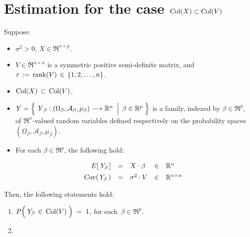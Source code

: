 

\section{Estimation for the case $\textnormal{Col}(X) \subset \textnormal{Col}(V)$}
\setcounter{theorem}{0}
\setcounter{equation}{0}

\renewcommand{\theenumi}{\roman{enumi}}
\renewcommand{\labelenumi}{\textnormal{(\theenumi)}$\;\;$}


\begin{theorem}
\label{BLUEColXsubsetColV}
\mbox{}
\vskip 0.1cm
\noindent
Suppose:
\begin{itemize}
\item
	$\sigma^{2} > 0$,
	$X \in \Re^{n \times p}$.
\item
	$V \in \Re^{n \times n}$ is a symmetric positive semi-definite matrix, and
	\,$r \,:=\, \textnormal{rank}(V) \,\in\, \{1,2,\ldots,n\}$.
\item
	{\color{red}$\textnormal{Col}(X) \,\subset\, \textnormal{Col}(V)$}.
\item
	$Y = \left\{\;
		\left.
		\overset{{\color{white}.}}{Y}_{\beta} : (\Omega_{\beta},\mathcal{A}_{\beta},\mu_{\beta}) \longrightarrow \Re^{n}
		\;\;\right\vert\;
		\beta \in \Re^{p}
		\;\right\}$
	is a family, indexed by $\beta \in \Re^{p}$,
	of $\Re^{n}$-valued random variables defined respectively on the
	probability spaces $(\Omega_{\beta},\mathcal{A}_{\beta},\mu_{\beta})$.
\item
	For each $\beta \in \Re^{p}$, the following hold:
	\begin{equation*}
	\begin{array}{rclcl}
	E\!\left[\;Y_{\beta}\,\right] &  \overset{{\color{white}\vert}}{=} & X \cdot \beta & \in & \Re^{n}
	\\
	\Cov\!\left(\,Y_{\beta}\,\right) & \overset{{\color{white}\vert}}{=} & \sigma^{2} \cdot V & \in & \Re^{n \times n}
	\end{array}
	\end{equation*}
\end{itemize}
Then, the following statements hold:
\begin{enumerate}
\item\label{PYinColVEqOne}
	$P\!\left(\;Y_{\beta} \,\overset{{\color{white}.}}{\in}\, \Col(V)\;\right) \; = \; 1$,\;
	for each \,$\beta \in \Re^{p}$.
\item\label{XtVdaggerX}

\end{enumerate}
\end{theorem}
